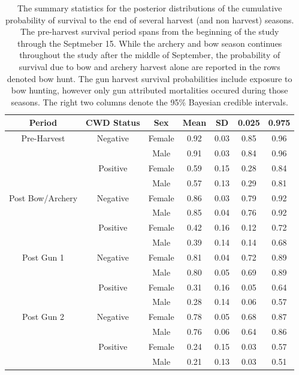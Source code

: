 \documentclass[12pt]{article}\usepackage[]{graphicx}\usepackage[]{color}
\begin{document}
\begin{table}[H]
\centering
\caption{The summary statistics for the posterior distributions of the cumulative probability of survival to the end of several harvest (and non harvest) seasons. The pre-harvest survival period spans from the beginning of the study through the Septmeber 15. While the archery and bow season continues throughout the study after the middle of September, the probability of survival due to bow and archery harvest alone are reported in the rows denoted bow hunt. The gun harvest survival probabilities include exposure to bow hunting, however only gun attributed mortalities occured during those seasons. The right two columns denote the 95\% Bayesian credible intervals.} 
\label{tab:survival_v8}
\begin{tabular}{ccccccc}
 Period & CWD Status & Sex & Mean & SD & 0.025 & 0.975 \\ 
  \hline
\hline
Pre-Harvest & Negative & Female & 0.92 & 0.03 & 0.85 & 0.96 \\ 
   &  & Male & 0.91 & 0.03 & 0.84 & 0.96 \\ 
   \hdashline 
 & Positive & Female & 0.59 & 0.15 & 0.28 & 0.84 \\ 
   &  & Male & 0.57 & 0.13 & 0.29 & 0.81 \\ 
   \hline
Post Bow/Archery  & Negative & Female & 0.86 & 0.03 & 0.79 & 0.92 \\ 
   &  & Male & 0.85 & 0.04 & 0.76 & 0.92 \\ 
   \hdashline 
 & Positive & Female & 0.42 & 0.16 & 0.12 & 0.72 \\ 
   &  & Male & 0.39 & 0.14 & 0.14 & 0.68 \\ 
   \hline
Post Gun 1 & Negative & Female & 0.81 & 0.04 & 0.72 & 0.89 \\ 
   &  & Male & 0.80 & 0.05 & 0.69 & 0.89 \\ 
   \hdashline 
 & Positive & Female & 0.31 & 0.16 & 0.05 & 0.64 \\ 
   &  & Male & 0.28 & 0.14 & 0.06 & 0.57 \\ 
   \hline
Post Gun 2 & Negative & Female & 0.78 & 0.05 & 0.68 & 0.87 \\ 
   &  & Male & 0.76 & 0.06 & 0.64 & 0.86 \\ 
   \hdashline 
 & Positive & Female & 0.24 & 0.15 & 0.03 & 0.57 \\ 
   &  & Male & 0.21 & 0.13 & 0.03 & 0.51 \\ 
   \hline
\hline
\end{tabular}
\end{table}
\end{document}
